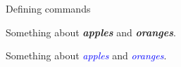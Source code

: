 \documentclass{article}
\newcommand\kw[1]{\textbf{\itshape #1}}
\newcommand\kwb[1]{\textcolor{blue}{\itshape #1}}
\begin{document}
Defining commands

Something about \kw{apples} and \kw{oranges}.

Something about \kwb{apples} and \kwb{oranges}.
\end{document}
